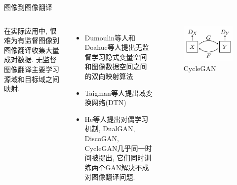 \begin{frame}{图像到图像翻译}
    \begin{columns}
        在实际应用中, 很难为有监督图像到图像翻译收集大量成对数据. 无监督图像翻译主要学习源域和目标域之间映射.
        \begin{itemize}
            \item Dumoulin等人和Doahue等人提出无监督学习隐式变量空间和图像数据空间之间的双向映射算法
            \item Taigman等人提出域变换网络(DTN)
            \item He等人提出对偶学习机制, DualGAN, DiscoGAN, CycleGAN几乎同一时间被提出, 它们同时训练两个GAN解决不成对图像翻译问题.
        \end{itemize}

        \begin{figure}
            \centering
            \includegraphics[width=\textwidth]{pic/chap0106.jpg}
            \caption{CycleGAN}
            \label{fig:0106}
        \end{figure}

    \end{columns}

\end{frame}

